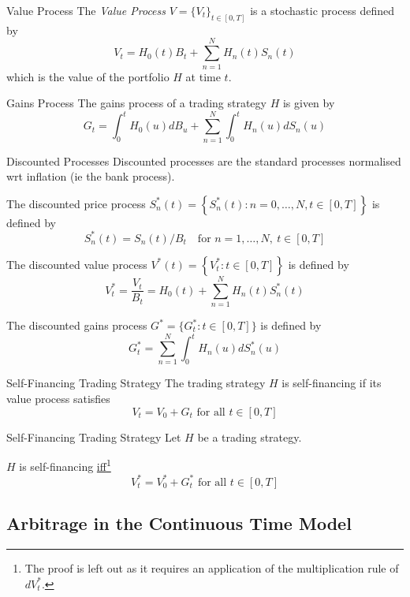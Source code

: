 \documentclass[11pt,a4paper]{article}
\begin{document}
  \begin{definition}{Value Process}
    The \textit{Value Process} $V=\{V_t\}_{t\in[0,T]}$ is a stochastic process defined by
    \[ V_t=H_0(t)B_t+\sum_{n=1}^NH_n(t)S_n(t) \]
    which is the value of the portfolio $H$ at time $t$.
  \end{definition}

  \begin{definition}{Gains Process}
    The gains process of a trading strategy $H$ is given by
    \[ G_t=\int_0^tH_0(u)dB_u+\sum_{n=1}^N\int_0^tH_n(u)dS_n(u) \]
  \end{definition}

  \begin{definition}{Discounted Processes}
    Discounted processes are the standard processes normalised wrt inflation (ie the bank process).
    \par The discounted price process $S_n^*(t)=\left\{S_n^*(t):n=0,\dots,N,t\in[0,T]\right\}$ is defined by
    \[ S_n^*(t)=S_n(t)/B_t\quad\text{for }n=1,\dots,N,\ t\in[0,T] \]
    \par The discounted value process $V^*(t)=\left\{V_t^*:t\in[0,T]\right\}$ is defined by
    \[ V_t^*=\frac{V_t}{B_t}=H_0(t)+\sum_{n=1}^NH_n(t)S_n^*(t) \]
    \par The discounted gains process $G^*=\{G_t^*:t\in[0,T]\}$ is defined by
    \[ G_t^*=\sum_{n=1}^N\int_0^tH_n(u)dS_n^*(u) \]
  \end{definition}

  \begin{definition}{Self-Financing Trading Strategy}
    The trading strategy $H$ is self-financing if its value process satisfies
    \[ V_t=V_0+G_t\text{ for all }t\in[0,T] \]
  \end{definition}


  \begin{theorem}{Self-Financing Trading Strategy}\label{the_self_financing_continuous_time}
    Let $H$ be a trading strategy.
    \par $H$ is self-financing \underline{iff}\footnote{The proof is left out as it requires an application of the multiplication rule of $dV_t^*$.}
    \[ V_t^*=V_0^*+G_t^*\text{ for all }t\in[0,T] \]
  \end{theorem}

\subsection{Arbitrage in the Continuous Time Model}
\end{document}
